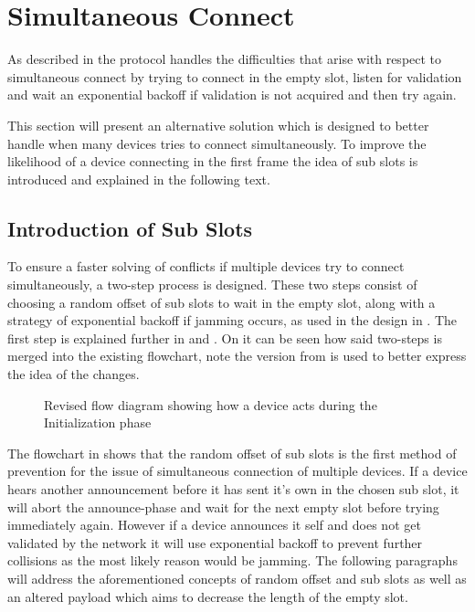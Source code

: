\section{Simultaneous Connect}
As described in  the protocol handles the difficulties that arise with respect to simultaneous connect by trying to connect in the empty slot, listen for validation and wait an exponential backoff if validation is not acquired and then try again.

This section will present an alternative solution which is designed to better handle when many devices tries to connect simultaneously.
To improve the likelihood of a device connecting in the first frame the idea of sub slots is introduced and explained in the following text.

\subsection{Introduction of Sub Slots} %
\label{sub:introduction_of_sub_slots}
To ensure a faster solving of conflicts if multiple devices try to connect simultaneously, a two-step process is designed.
These two steps consist of choosing a random offset of sub slots to wait in the empty slot, along with a strategy of exponential backoff if jamming occurs, as used in the design in .
The first step is explained further in   and  .
On  it can be seen how said two-steps is merged into the existing flowchart, note the version from  is used to better express the idea of the changes.%

\begin{figure}[p]
    \centering \footnotesize
    
    \caption{Revised flow diagram showing how a device acts during the Initialization phase}
    \label{fig:pseudo_flowMultiConnectimp}
\end{figure}

The flowchart in  shows that the random offset of sub slots is the first method of prevention for the issue of simultaneous connection of multiple devices.
If a device hears another announcement before it has sent it's own in the chosen sub slot, it will abort the announce-phase and wait for the next empty slot before trying immediately again.
However if a device announces it self and does not get validated by the network it will use exponential backoff to prevent further collisions as the most likely reason would be jamming.
The following paragraphs will address the aforementioned concepts of random offset and sub slots as well as an altered payload which aims to decrease the length of the empty slot.

